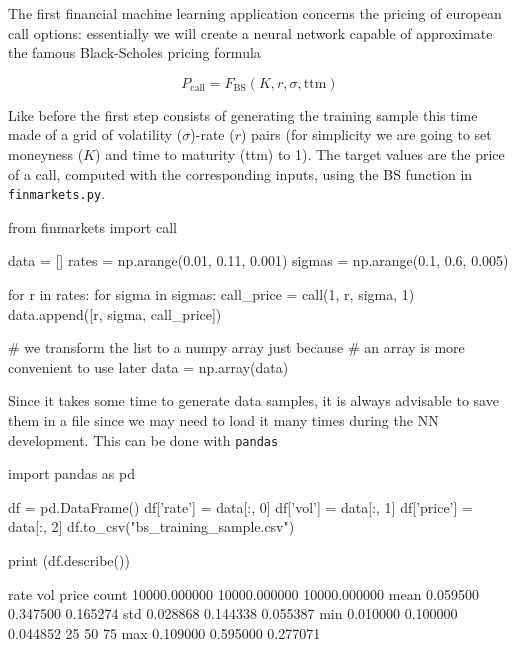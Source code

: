 The first financial machine learning application concerns the pricing of european call options: essentially we will create a neural network capable of approximate the famous Black-Scholes pricing formula

\begin{equation} 
	P_\textrm{call} = F_\textrm{BS}(K, r, \sigma, \mathrm{ttm})
\end{equation}

Like before the first step consists of generating the training sample this time made of a grid of volatility ($\sigma$)-rate ($r$) pairs (for simplicity we are going to set moneyness ($K$) and time to maturity (ttm) to 1). The target values are the price of a call, computed with the corresponding inputs, using the BS function in \texttt{finmarkets.py}.

\begin{ipython}
from finmarkets import call

data = []
rates = np.arange(0.01, 0.11, 0.001)
sigmas = np.arange(0.1, 0.6, 0.005)

for r in rates:
for sigma in sigmas:
call_price = call(1, r, sigma, 1)
data.append([r, sigma, call_price])

# we transform the list to a numpy array just because
# an array is more convenient to use later
data = np.array(data)
\end{ipython}

Since it takes some time to generate data samples, it is always advisable to save them in a file since we may need to load it many times during the NN development. This can be done with \texttt{pandas}

\begin{ipython}
import pandas as pd

df = pd.DataFrame()
df['rate'] = data[:, 0]
df['vol'] = data[:, 1]
df['price'] = data[:, 2]
df.to_csv("bs_training_sample.csv")

print (df.describe())
\end{ipython}
\begin{ioutput}
               rate           vol         price
count  10000.000000  10000.000000  10000.000000
mean       0.059500      0.347500      0.165274
std        0.028868      0.144338      0.055387
min        0.010000      0.100000      0.044852
25%
50%
75%
max        0.109000      0.595000      0.277071
\end{ioutput}

